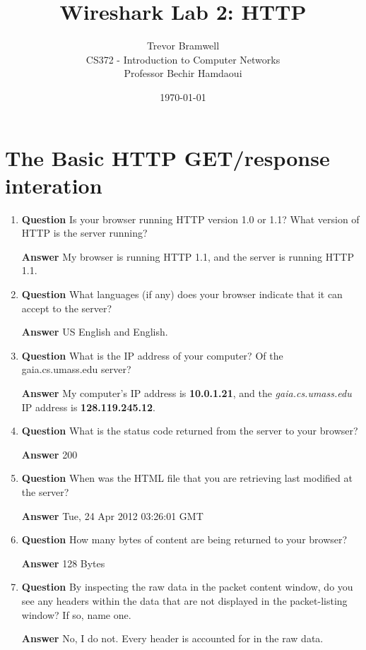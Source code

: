 \documentclass[12pt,letterpaper]{article}
\title{Wireshark Lab 2: HTTP}
\author{
    Trevor Bramwell \\
    CS372 - Introduction to Computer Networks \\
    Professor Bechir Hamdaoui
}
\date{\today}
\newcommand{\q}{\textbf{Question} }
\newcommand{\ans}{\textbf{Answer} }
\begin{document}
\maketitle

\section{The Basic HTTP GET/response interation}
\begin{enumerate}
\item \q Is your browser running HTTP version 1.0 or 1.1?  What version of HTTP
    is the server running? 

\ans My browser is running HTTP 1.1, and the server is running HTTP 1.1.

\item \q What languages (if any) does your browser indicate that it can accept
    to the server? 

\ans US English and English.

\item \q What is the IP address of your computer?  Of the gaia.cs.umass.edu
    server? 

\ans My computer's IP address is \textbf{10.0.1.21}, and the
    \emph{gaia.cs.umass.edu} IP address is \textbf{128.119.245.12}.

\item \q What is the status code returned from the server to your browser?  

\ans 200

\item \q When was the HTML file that you are retrieving last modified at the
    server? 

\ans Tue, 24 Apr 2012 03:26:01 GMT

\item \q How many bytes of content are being returned to your browser? 

\ans 128 Bytes

\item \q By inspecting the raw data in the packet content window, do you see
    any headers within the data that are not displayed in the packet-listing
    window? If so, name one.

\ans No, I do not. Every header is accounted for in the raw data.
\end{enumerate}


\pagebreak
\pagebreak
\pagebreak
\end{document}
